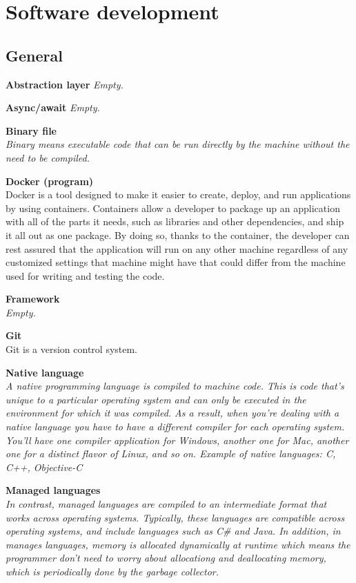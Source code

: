 \section{Software development}
\setcounter{secnumdepth}{3}

\subsection{General}

\textbf{Abstraction layer}
\textit{Empty.}

\textbf{Async/await}
\textit{Empty.}

\textbf{Binary file} \\
\textit{Binary means executable code that can be run directly by the machine without the need to be compiled.}

\textbf{Docker (program) } \\
Docker is a tool designed to make it easier to create, deploy, and run applications by using containers. Containers allow a developer to package up an application with all of the parts it needs, such as libraries and other dependencies, and ship it all out as one package. By doing so, thanks to the container, the developer can rest assured that the application will run on any other machine regardless of any customized settings that machine might have that could differ from the machine used for writing and testing the code.

\textbf{Framework} \\
\textit{Empty.}

\textbf{Git} \\
Git is a version control system. 

\textbf{Native language} \\
\textit{A native programming language is compiled to machine code. This is code that's unique to a particular operating system and can only be executed in the environment for which it was compiled. As a result, when you're dealing with a native language you have to have a different compiler for each operating system. You'll have one compiler application for Windows, another one for Mac, another one for a distinct flavor of Linux, and so on. Example of native languages: C, C++, Objective-C }

\textbf{Managed languages} \\
\textit{In contrast, managed languages are compiled to an intermediate format that works across operating systems. Typically, these languages are compatible across operating systems, and include languages such as C\# and Java. In addition, in manages languages, memory is allocated dynamically at runtime which means the programmer don't need to worry about allocationg and deallocating memory, which is periodically done by the garbage collector. }

